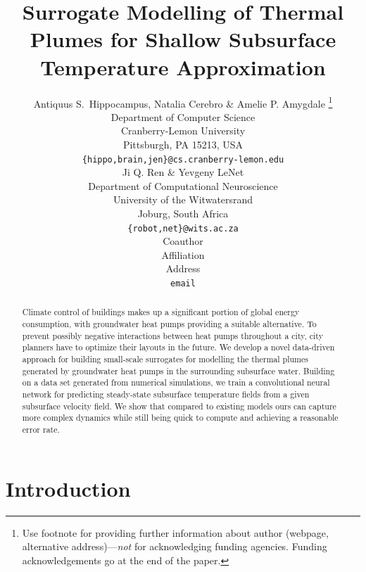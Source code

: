 \documentclass{article} %
\title{Surrogate Modelling of Thermal Plumes for Shallow Subsurface Temperature Approximation}
\author{Antiquus S.~Hippocampus, Natalia Cerebro \& Amelie P. Amygdale \thanks{ Use footnote for providing further information
about author (webpage, alternative address)---\emph{not} for acknowledging
funding agencies.  Funding acknowledgements go at the end of the paper.} \\
Department of Computer Science\\
Cranberry-Lemon University\\
Pittsburgh, PA 15213, USA \\
\texttt{\{hippo,brain,jen\}@cs.cranberry-lemon.edu} \\
\And
Ji Q. Ren \& Yevgeny LeNet \\
Department of Computational Neuroscience \\
University of the Witwatersrand \\
Joburg, South Africa \\
\texttt{\{robot,net\}@wits.ac.za} \\
\AND
Coauthor \\
Affiliation \\
Address \\
\texttt{email}
}
\begin{document}
\maketitle

\begin{abstract}
   Climate control of buildings makes up a significant portion of global energy consumption, with groundwater heat pumps providing a suitable alternative.
   To prevent possibly negative interactions between heat pumps throughout a city, city planners have to optimize their layouts in the future.
   We develop a novel data-driven approach for building small-scale surrogates for modelling the thermal plumes generated by groundwater heat pumps in the surrounding subsurface water.
   Building on a data set generated from numerical simulations, we train a convolutional neural network for predicting steady-state subsurface temperature fields from a given subsurface velocity field.
   We show that compared to existing models ours can capture more complex dynamics while still being quick to compute and achieving a reasonable error rate.
\end{abstract}

\section{Introduction}
\label{sec:intro}
\end{document}
